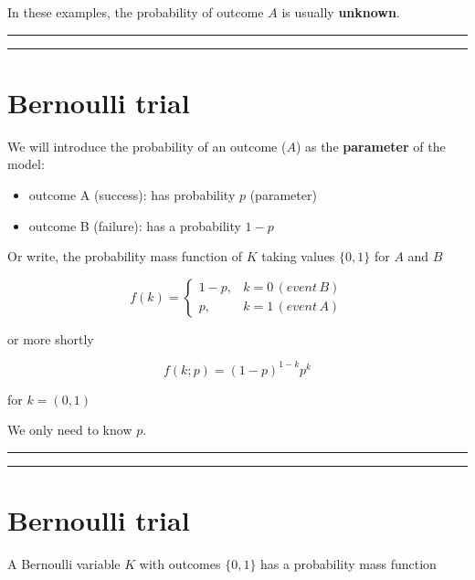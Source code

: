 \documentclass[
]{book}
\providecommand{\tightlist}{%
  \setlength{\itemsep}{0pt}\setlength{\parskip}{0pt}}
\begin{document}
In these examples, the probability of outcome \(A\) is usually \textbf{unknown}.

\begin{center}\rule{0.5\linewidth}{0.5pt}\end{center}

\begin{center}\rule{0.5\linewidth}{0.5pt}\end{center}

\hypertarget{bernoulli-trial-1}{%
\section{Bernoulli trial}\label{bernoulli-trial-1}}

We will introduce the probability of an outcome (\(A\)) as the \textbf{parameter} of the model:

\begin{itemize}
\tightlist
\item
  outcome A (success): has probability \(p\) (parameter)
\item
  outcome B (failure): has a probability \(1-p\)
\end{itemize}

Or write, the probability mass function of \(K\) taking values \(\{0, 1\}\) for \(A\) and \(B\)

\[
    f(k)= 
\begin{cases}
    1-p,&  k=0\, (event\, B)\\
    p,& k=1\, (event\, A) 
\end{cases}
\]

or more shortly

\[f(k; p)=(1-p)^{1-k} p^k\]

for \(k=(0,1)\)

We only need to know \(p\).

\begin{center}\rule{0.5\linewidth}{0.5pt}\end{center}

\begin{center}\rule{0.5\linewidth}{0.5pt}\end{center}

\hypertarget{bernoulli-trial-2}{%
\section{Bernoulli trial}\label{bernoulli-trial-2}}

A Bernoulli variable \(K\) with outcomes \(\{0, 1\}\) has a probability mass function
\end{document}
